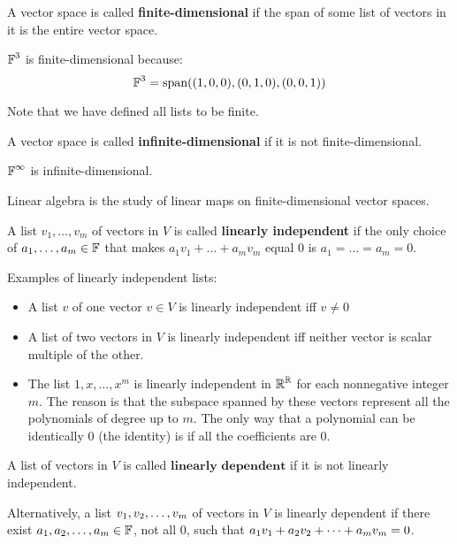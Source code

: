 \begin{definition}
    A vector space is called \textbf{finite-dimensional} if the span of some
    list of vectors in it is the entire vector space.
\end{definition}

\begin{example}
    $\operatorname{\mathbb{F}}^3$ is finite-dimensional because:
    \[ \operatorname{\mathbb{F}}^3 = \text{span} ((1, 0, 0), (0, 1, 0), (0, 0, 1))\]
\end{example}
Note that we have defined all lists to be finite.

\begin{definition}
    A vector space is called \textbf{infinite-dimensional} if it is not finite-dimensional.
\end{definition}

\begin{example}
    $\operatorname{\mathbb{F}}^{\infty}$ is infinite-dimensional.
\end{example}

Linear algebra is the study of linear maps on finite-dimensional vector spaces.

\begin{definition}
    A list $v_1, \ldots, v_m$ of vectors in $V$ is called \textbf{linearly independent}
    if the only choice of $a_1, \ldots, a_m \in \operatorname{\mathbb{F}}$ that makes $a_1 v_1 + \dots + a_m v_m$ equal 0 is
    $a_1 = \dots = a_m = 0$.
\end{definition}

\begin{example}
    Examples of linearly independent lists:
    \begin{itemize}
        \item A list $v$ of one vector $v \in V$ is linearly independent iff $v \neq 0$
        \item A list of two vectors in $V$ is linearly independent iff neither
        vector is scalar multiple of the other.
        \item The list $1, x, \dots, x^m$ is linearly independent in $\operatorname{\mathbb{R}}^{\operatorname{\mathbb{R}}}$ for
        each nonnegative integer $m$. The reason is that the subspace spanned by these vectors
        represent all the polynomials of degree up to $m$. The only way that a polynomial can be 
        identically 0 (the identity) is if all the coefficients are 0.
    \end{itemize}
\end{example}

\begin{definition}
    A list of vectors in $V$ is called $\textbf{linearly dependent}$ if it is not linearly independent.

    Alternatively, a list $v_1, v_2, \ldots, v_m$ of vectors in $V$ is linearly dependent if there exist
    $a_1, a_2, \ldots, a_m \in \operatorname{\mathbb{F}}$, not all 0, such that $a_1v_1 + a_2v_2 + \cdots + a_mv_m = 0$.
\end{definition}


